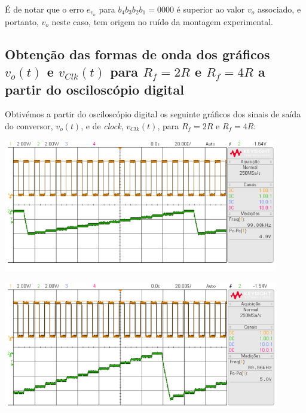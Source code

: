 \documentclass[a4paper,11pt]{report}
\begin{document}
É de notar que o erro $e_{v_o}$ para $b_4b_3b_2b_1=0000$ é superior ao valor $v_o$ associado, e portanto, $v_o$ neste caso, tem origem no ruído da montagem experimental.

\subsection{Obtenção das formas de onda dos gráficos $v_o(t)$ e $v_{Clk}(t)$ para $R_f=2R$ e $R_f=4R$ a partir do osciloscópio digital}

Obtivémos a partir do osciloscópio digital os seguinte gráficos dos sinais de saída do conversor, $v_o(t)$, e de \textit{clock}, $v_{Clk}(t)$, para $R_f=2R$ e $R_f=4R$:

\begin{center}
     \includegraphics[angle=0,width=0.9\textwidth]{42R.png}
     \label{fig:42R}
     \end{center}
     
\begin{center}
     \includegraphics[angle=0,width=0.9\textwidth]{44R.png}
     \label{fig:44R}
     \end{center}
\end{document}
